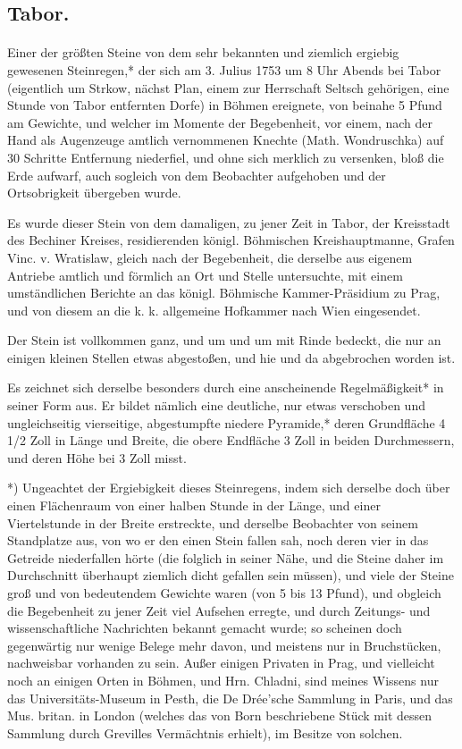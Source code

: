 \documentclass[a4paper, 11pt, oneside, german]{article}
\begin{document}
\subsection{Tabor.}
\paragraph{}
Einer der größten Steine von dem sehr bekannten und ziemlich ergiebig gewesenen Steinregen,* der sich am 3. Julius 1753 um 8 Uhr Abends bei Tabor (eigentlich um Strkow, nächst Plan, einem zur Herrschaft Seltsch gehörigen, eine Stunde von Tabor entfernten Dorfe) in Böhmen ereignete, von beinahe 5 Pfund am Gewichte, und welcher im Momente der Begebenheit, vor einem, nach der Hand als Augenzeuge amtlich vernommenen Knechte (Math. Wondruschka) auf 30 Schritte Entfernung niederfiel, und ohne sich merklich zu versenken, bloß die Erde aufwarf, auch sogleich von dem Beobachter aufgehoben und der Ortsobrigkeit übergeben wurde.

Es wurde dieser Stein von dem damaligen, zu jener Zeit in Tabor, der Kreisstadt des Bechiner Kreises, residierenden königl. Böhmischen Kreishauptmanne, Grafen Vinc. v. Wratislaw, gleich nach der Begebenheit, die derselbe aus eigenem Antriebe amtlich und förmlich an Ort und Stelle untersuchte, mit einem umständlichen Berichte an das königl. Böhmische Kammer-Präsidium zu Prag, und von diesem an die k. k. allgemeine Hofkammer nach Wien eingesendet.

Der Stein ist vollkommen ganz, und um und um mit Rinde bedeckt, die nur an einigen kleinen Stellen etwas abgestoßen, und hie und da abgebrochen worden ist.

Es zeichnet sich derselbe besonders durch eine anscheinende Regelmäßigkeit* in seiner Form aus. Er bildet nämlich eine deutliche, nur etwas verschoben und ungleichseitig vierseitige, abgestumpfte niedere Pyramide,* deren Grundfläche 4 1/2 Zoll in Länge und Breite, die obere Endfläche 3 Zoll in beiden Durchmessern, und deren Höhe bei 3 Zoll misst.

*) Ungeachtet der Ergiebigkeit dieses Steinregens, indem sich derselbe doch über einen Flächenraum von einer halben Stunde in der Länge, und einer Viertelstunde in der Breite erstreckte, und derselbe Beobachter von seinem Standplatze aus, von wo er den einen Stein fallen sah, noch deren vier in das Getreide niederfallen hörte (die folglich in seiner Nähe, und die Steine daher im Durchschnitt überhaupt ziemlich dicht gefallen sein müssen), und viele der Steine groß und von bedeutendem Gewichte waren (von 5 bis 13 Pfund), und obgleich die Begebenheit zu jener Zeit viel Aufsehen erregte, und durch Zeitungs- und wissenschaftliche Nachrichten bekannt gemacht wurde; so scheinen doch gegenwärtig nur wenige Belege mehr davon, und meistens nur in Bruchstücken, nachweisbar vorhanden zu sein. Außer einigen Privaten in Prag, und vielleicht noch an einigen Orten in Böhmen, und Hrn. Chladni, sind meines Wissens nur das Universitäts-Museum in Pesth, die De Drée'sche Sammlung in Paris, und das Mus. britan. in London (welches das von Born beschriebene Stück mit dessen Sammlung durch Grevilles Vermächtnis erhielt), im Besitze von solchen.
\end{document}
